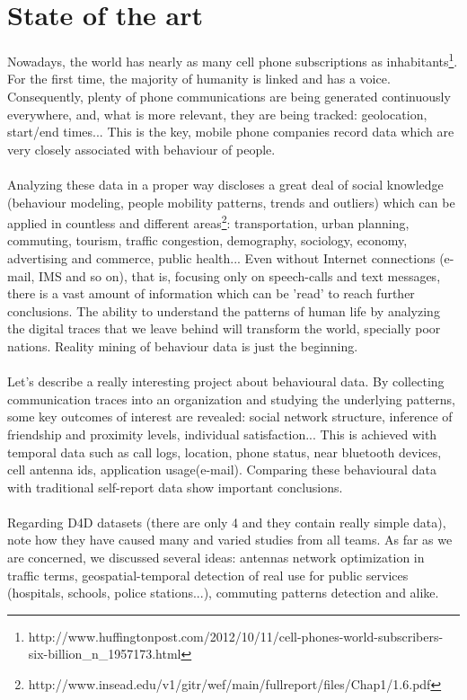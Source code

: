 \newpage

\section{State of the art}

Nowadays, the world has nearly as many cell phone subscriptions as inhabitants\footnote{http://www.huffingtonpost.com/2012/10/11/cell-phones-world-subscribers-six-billion\_n\_1957173.html}. For the first time, the majority of humanity is linked and has a voice. Consequently, plenty of phone communications are being generated continuously everywhere, and, what is more relevant, they are being tracked: geolocation, start/end times... This is the key, mobile phone companies record data which are very closely associated with behaviour of people.
\\
\\
Analyzing these data in a proper way discloses a great deal of social knowledge (behaviour modeling, people mobility patterns, trends and outliers) which can be applied in countless and different areas\footnote{http://www.insead.edu/v1/gitr/wef/main/fullreport/files/Chap1/1.6.pdf}: transportation, urban planning, commuting, tourism, traffic congestion, demography, sociology, economy, advertising and commerce, public health... Even without Internet connections (e-mail, IMS and so on), that is, focusing only on speech-calls and text messages, there is a vast amount of information which can be 'read' to reach further conclusions. The ability to understand the patterns of human life by analyzing the digital traces that we leave behind will transform the world, specially poor nations. Reality mining of behaviour data is just the beginning.
\\
\\
Let's describe a really interesting project \citep{eage09} about behavioural data. By collecting communication traces into an organization and studying the underlying patterns, some key outcomes of interest are revealed: social network structure, inference of friendship and proximity levels, individual satisfaction... This is achieved with temporal data such as call logs, location, phone status, near bluetooth devices, cell antenna ids, application usage(e-mail). Comparing these behavioural data with traditional self-report data show important conclusions.
\\
\\
Regarding D4D datasets (there are only 4 and they contain really simple data), note how they have caused many and varied studies from all teams. As far as we are concerned, we discussed several ideas: antennas network optimization in traffic terms, geospatial-temporal detection of real use for public services (hospitals, schools, police stations...), commuting patterns detection and alike.
